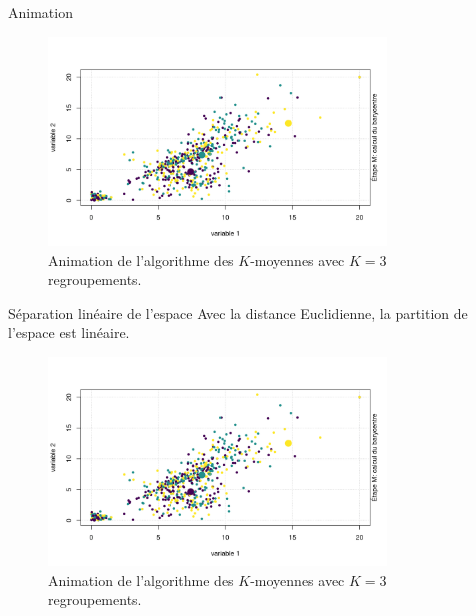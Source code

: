 \documentclass[
  ignorenonframetext,
]{beamer}
\begin{document}
\begin{frame}{Animation}
\protect\hypertarget{animation}{}
\begin{figure}

{\centering \includegraphics[width=0.8\textwidth,height=\textheight]{figures/fig-kmoy-animation.gif}

}

\caption{\label{fig-kmoyanimation}Animation de l'algorithme des
\(K\)-moyennes avec \(K=3\) regroupements.}

\end{figure}
\end{frame}

\begin{frame}{Séparation linéaire de l'espace}
\protect\hypertarget{suxe9paration-linuxe9aire-de-lespace}{}
Avec la distance Euclidienne, la partition de l'espace est linéaire.

\begin{figure}

{\centering \includegraphics[width=0.8\textwidth,height=\textheight]{figures/fig-kmoy-animation.gif}

}

\caption{\label{fig-voronoy}Animation de l'algorithme des \(K\)-moyennes
avec \(K=3\) regroupements.}

\end{figure}
\end{frame}
\end{document}
